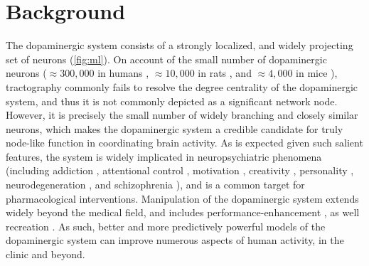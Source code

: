 \section{Background}


The dopaminergic system consists of a strongly localized, and widely projecting set of neurons (\cref{fig:ml}).
On account of the small number of dopaminergic neurons ($\approx300,000$ in humans \cite{rice2016}, $\approx10,000$ in rats \cite{german1993}, and $\approx4,000$ in mice \cite{triarhou1988}), tractography commonly fails to resolve the degree centrality of the dopaminergic system, and thus it is not commonly depicted as a significant network node.
However, it is precisely the small number of widely branching and closely similar neurons, which makes the dopaminergic system a credible candidate for truly node-like function in coordinating brain activity.
As is expected given such salient features, the system is widely implicated in neuropsychiatric phenomena (including
addiction \cite{DiChiara1988,DiChiara1999},
attentional control \cite{Nieoullon2002},
motivation \cite{Salamone1994},
creativity \cite{Chermahini2010},
personality \cite{Depue1999},
neurodegeneration \cite{Masliah2000},
and schizophrenia \cite{Howes2009}),
and is a common target for pharmacological interventions.
Manipulation of the dopaminergic system extends widely beyond the medical field, and includes performance-enhancement \cite{Mehta2000,Turner2003}, as well recreation \cite{DiChiara1988}.
As such, better and more predictively powerful models of the dopaminergic system can improve numerous aspects of human activity, in the clinic and beyond.

